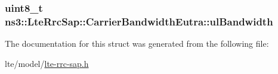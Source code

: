 \subsubsection[{\texorpdfstring{ul\+Bandwidth}{ulBandwidth}}]{\setlength{\rightskip}{0pt plus 5cm}uint8\+\_\+t ns3\+::\+Lte\+Rrc\+Sap\+::\+Carrier\+Bandwidth\+Eutra\+::ul\+Bandwidth}\hypertarget{structns3_1_1LteRrcSap_1_1CarrierBandwidthEutra_a14b58cc270f1cfa97f8f4965a151bf26}{}\label{structns3_1_1LteRrcSap_1_1CarrierBandwidthEutra_a14b58cc270f1cfa97f8f4965a151bf26}


The documentation for this struct was generated from the following file\+:\begin{DoxyCompactItemize}
\item 
lte/model/\hyperlink{lte-rrc-sap_8h}{lte-\/rrc-\/sap.\+h}\end{DoxyCompactItemize}
